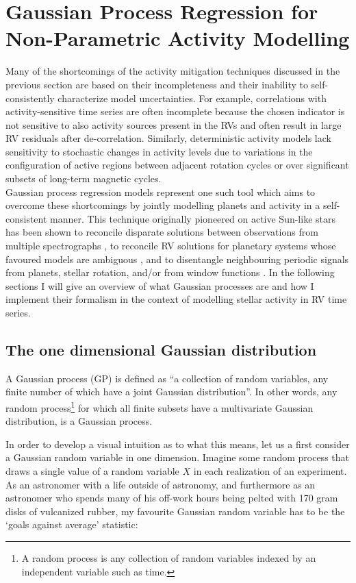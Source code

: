 \section{Gaussian Process Regression for Non-Parametric Activity Modelling} \label{sect:gp}
Many of the shortcomings of the activity mitigation techniques discussed in the
previous section are based on their incompleteness and their inability to
self-consistently characterize model uncertainties. For example, correlations with
activity-sensitive time series are often incomplete because the chosen indicator
is not sensitive to also activity sources present in the RVs and often result in
large RV residuals after de-correlation. Similarly, deterministic activity models
lack sensitivity to stochastic changes in activity levels due to variations in
the configuration of active regions between adjacent rotation cycles or over
significant subsets of long-term magnetic cycles. \\

Gaussian process regression models represent one such tool which aims to overcome
these shortcomings by jointly modelling planets and activity in a self-consistent
manner. This technique originally pioneered on active Sun-like stars
\citep{haywood14,rajpaul15} has been shown to reconcile disparate solutions
between observations from multiple spectrographs \citep{rajpaul17,cloutier18b},
to reconcile RV solutions for planetary systems whose favoured models are
ambiguous \citep{rajpaul17,cloutier18b}, and to disentangle neighbouring periodic
signals from planets, stellar rotation, and/or from window functions
\citep{rajpaul16,cloutier17b}.
In the following sections I will give an overview
of what Gaussian processes are and how I implement their formalism in the context
of modelling stellar activity in RV time series.

\subsection{The one dimensional Gaussian distribution}
A Gaussian process (GP) is defined as ``a collection of random variables, any
finite number of which have a joint Gaussian distribution''. In other words,
any random process\footnote{A random process is any collection of random
  variables indexed by an independent variable such as time.} for which all
finite subsets have a multivariate Gaussian distribution, is a Gaussian process.

In order to develop a visual intuition as to what this means, let us a first
consider a Gaussian random variable in one dimension. Imagine some random
process that draws a single value of a random variable $X$ in each realization of
an experiment. As an astronomer with a life
outside of astronomy, and furthermore as an astronomer who spends many of his
off-work hours being pelted with 170 gram disks of vulcanized rubber, my favourite
Gaussian random variable has to be the `goals against average' statistic:

